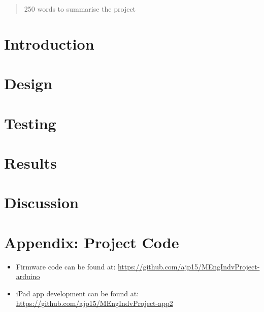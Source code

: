 \documentclass[12pt,twoside]{article}
\begin{document}


\begin{abstract}
    250 words to summarise the project
    
\end{abstract}

\newpage


\section{Introduction}


\section{Design}


\section{Testing}


\section{Results}


\section{Discussion}




\newpage



\newpage

\appendix
\section{Appendix: Project Code}
\label{appendix: a}
\begin{itemize}
    \item Firmware code can be found at: \newline \url{https://github.com/ajp15/MEngIndvProject-arduino}
    \item iPad app development can be found at: \newline \url{https://github.com/ajp15/MEngIndvProject-app2}
\end{itemize}
\end{document}

